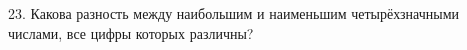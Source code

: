 23. Какова разность между наибольшим и наименьшим четырёхзначными числами, все цифры которых различны?\\
